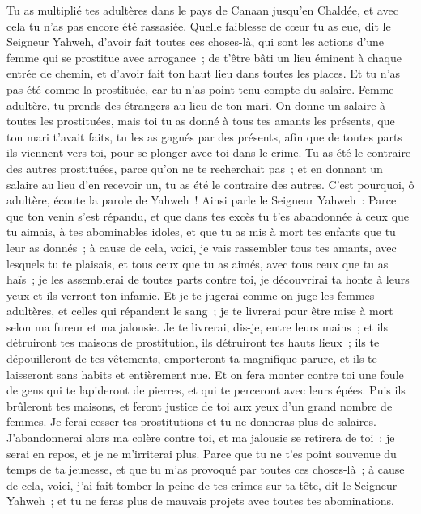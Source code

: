 \begin{multicols}{2}
Tu as multiplié tes adultères dans le pays de Canaan jusqu'en Chaldée, et avec cela tu n'as pas encore été rassasiée.
Quelle faiblesse de cœur tu as eue, dit le Seigneur Yahweh, d'avoir fait toutes ces choses-là, qui sont les actions d'une femme qui se prostitue avec arrogance~;
de t'être bâti un lieu éminent à chaque entrée de chemin, et d'avoir fait ton haut lieu dans toutes les places. Et tu n'as pas été comme la prostituée, car tu n'as point tenu compte du salaire.
Femme adultère, tu prends des étrangers au lieu de ton mari.
On donne un salaire à toutes les prostituées, mais toi tu as donné à tous tes amants les présents, que ton mari t'avait faits, tu les as gagnés par des présents, afin que de toutes parts ils viennent vers toi, pour se plonger avec toi dans le crime.
Tu as été le contraire des autres prostituées, parce qu'on ne te recherchait pas~; et en donnant un salaire au lieu d'en recevoir un, tu as été le contraire des autres.
C'est pourquoi, ô adultère, écoute la parole de Yahweh~!
Ainsi parle le Seigneur Yahweh~: Parce que ton venin s'est répandu, et que dans tes excès tu t'es abandonnée à ceux que tu aimais, à tes abominables idoles, et que tu as mis à mort tes enfants que tu leur as donnés~;
à cause de cela, voici, je vais rassembler tous tes amants, avec lesquels tu te plaisais, et tous ceux que tu as aimés, avec tous ceux que tu as haïs~; je les assemblerai de toutes parts contre toi, je découvrirai ta honte à leurs yeux et ils verront ton infamie.
Et je te jugerai comme on juge les femmes adultères, et celles qui répandent le sang~; je te livrerai pour être mise à mort selon ma fureur et ma jalousie.
Je te livrerai, dis-je, entre leurs mains~; et ils détruiront tes maisons de prostitution, ils détruiront tes hauts lieux~; ils te dépouilleront de tes vêtements, emporteront ta magnifique parure, et ils te laisseront sans habits et entièrement nue.
Et on fera monter contre toi une foule de gens qui te lapideront de pierres, et qui te perceront avec leurs épées.
Puis ils brûleront tes maisons, et feront justice de toi aux yeux d'un grand nombre de femmes. Je ferai cesser tes prostitutions et tu ne donneras plus de salaires.
J'abandonnerai alors ma colère contre toi, et ma jalousie se retirera de toi~; je serai en repos, et je ne m'irriterai plus.
Parce que tu ne t'es point souvenue du temps de ta jeunesse, et que tu m'as provoqué par toutes ces choses-là~; à cause de cela, voici, j'ai fait tomber la peine de tes crimes sur ta tête, dit le Seigneur Yahweh~; et tu ne feras plus de mauvais projets avec toutes tes abominations.

\end{multicols}
